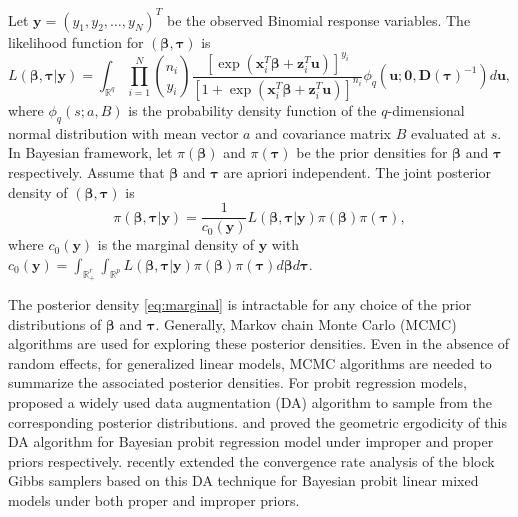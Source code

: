 \documentclass[11pt,a4paper]{article}
\begin{document}
Let $\bm{y} = (y_1, y_2, \dots, y_N)^T$ be the observed Binomial response variables. The likelihood function for $(\bm{\beta}, \bm{\tau})$ is
\begin{equation}
\label{eq:likelihood}
L\left(\bm{\beta},\bm{\tau}|\bm{y}\right)=\int_{\mathbb{R}^{q}}\prod_{i=1}^{N} {n_i \choose y_i} \frac{\left[\exp\left(\bm{x}_{i}^{T}\bm{\beta}+\bm{z}_{i}^{T}\bm{u}\right)\right]^{y_{i}}}{\left[1+\exp\left(\bm{x}_{i}^{T}\bm{\beta}+\bm{z}_{i}^{T}\bm{u}\right)\right]^{n_{i}}}\phi_{q}\left(\bm{u};\bm{0},\bm{D}(\bm{\tau})^{-1}\right)d\bm{u},
\end{equation}
where $\phi_{q}(s;a,B)$ is the probability density function of the $q$-dimensional normal distribution with mean vector $a$ and covariance matrix $B$ evaluated at $s$. In Bayesian framework, let $\pi\left(\bm{\beta}\right)$ and $\pi\left(\bm{\tau}\right)$ be the prior densities for $\bm{\beta}$ and $\bm{\tau}$ respectively. Assume that $\bm{\beta}$ and $\bm{\tau}$ are apriori independent. The joint posterior density of $\left(\bm{\beta},\bm{\tau}\right)$ is
\begin{equation}
\label{eq:marginal}
\pi\left(\bm{\beta},\bm{\tau}|\bm{y}\right)=\frac{1}{c_0\left(\bm{y}\right)}L\left(\bm{\beta},\bm{\tau}|\bm{y}\right)\pi\left(\bm{\beta}\right)\pi\left(\bm{\tau}\right),
\end{equation}
where  $c_0(\bm{y})$ is the marginal density of $\bm{y}$ with $
c_0\left(\bm{y}\right)=\int_{\mathbb{R}_{+}^{r}}\int_{\mathbb{R}^{p}}L\left(\bm{\beta},\bm{\tau}|\bm{y}\right)\pi\left(\bm{\beta}\right)\pi\left(\bm{\tau}\right)d\bm{\beta}d\bm{\tau}$.

The posterior density \eqref{eq:marginal} is intractable for any choice of the prior distributions of $\bm{\beta}$ and $\bm{\tau}$.  Generally, Markov chain Monte Carlo (MCMC) algorithms are used for exploring these posterior densities. Even in the absence of random effects, for generalized linear models, MCMC algorithms are needed to summarize the associated posterior densities. For probit regression models, \cite{albert1993bayesian} proposed a widely used data augmentation (DA) algorithm to sample from the corresponding posterior distributions. \cite{roy2007convergence} and \cite{chakraborty2017convergence} proved the geometric ergodicity of this DA algorithm for Bayesian probit regression model under improper and proper priors respectively. \cite{wang2017convergence} recently extended the convergence rate analysis of the block Gibbs samplers based on this DA technique for Bayesian probit linear mixed models under both proper and improper priors. 
\end{document}
